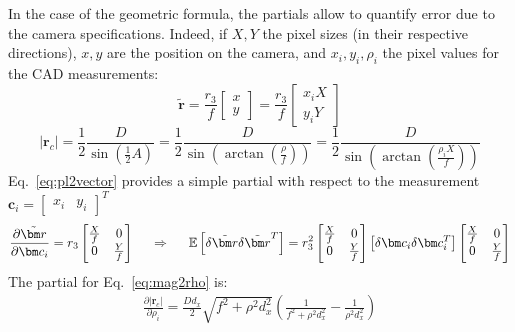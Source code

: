 In the case of the geometric formula, the partials allow to quantify error due to the camera specifications. Indeed, if $X, Y$ the pixel sizes (in their respective directions), $x,y$ are the position on the camera, and $x_i, y_i, \rho_i$ the pixel values for the CAD measurements:
\begin{equation}\label{eq:pl2vector}
\tilde{\bm r} =\frac{r_3}{f} \begin{bmatrix} x \\ y \end{bmatrix} =\frac{r_3}{f} \begin{bmatrix} x_i X \\ y_i Y \end{bmatrix} 
\end{equation}
\begin{equation}\label{eq:mag2rho}
|\bm r_c| = \frac{1}{2}\frac{D}{\sin\left(\frac{1}{2} A\right)} = \frac{1}{2}\frac{D}{\sin\left( \arctan \left( \frac{\rho}{f}\right)\right)} = \frac{1}{2}\frac{D}{\sin\left(\arctan \left( \frac{\rho_i X}{f}\right)\right)} 
\end{equation}
Eq.~\eqref{eq:pl2vector} provides a simple partial with respect to the measurement $\bm c_i = \begin{bmatrix} x_i & y_i\end{bmatrix}^T$
\begin{equation}
\frac{\partial \tilde{\bm r}}{\partial \bm c_i } = r_3\begin{bmatrix} \frac{X}{f} & 0 \\ 0 & \frac{Y}{f} \end{bmatrix} \hspace{0.5cm}\Rightarrow \hspace{0.5cm}\mathbb{E}\left[ \delta \tilde{\bm r} \delta  \tilde{\bm r}^T \right] =  r_3^2\begin{bmatrix} \frac{X}{f} & 0 \\ 0 & \frac{Y}{f} \end{bmatrix} \left[ \delta \bm c_i \delta \bm c_i ^T \right]  \begin{bmatrix} \frac{X}{f} & 0 \\ 0 & \frac{Y}{f} \end{bmatrix} 
\end{equation}
The partial for Eq.~\eqref{eq:mag2rho} is:
\begin{align}
\frac{\partial |\bm r_c|}{\partial \rho_i } = \frac{Dd_x}{2} \sqrt{f^2+ \rho^2 d_x^2}\left(\frac{1}{f^2+ \rho^2d_x^2}-\frac{1}{\rho^2 d_x^2} \right)
\end{align}
